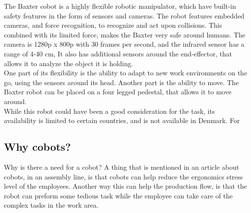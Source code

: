 The Baxter cobot is a highly flexible robotic manipulator, which have built-in safety features in the form of sensors and cameras. The robot features embedded cameras, and force recognition, to recognize and act upon collisions. This combined with its limited force, makes the Baxter very safe around humans.
The camera is 1280p x 800p with 30 frames per second, and the infrared sensor has a range of 4-40 cm, 
It also has additional sensors around the end-effector, that allows it to analyze the object it is holding. \\
One part of its flexibility is the ability to adapt to new work environments on the go, using the sensors around its head. Another part is the ability to move. The Baxter robot can be placed on a four legged pedestal, that allows it to move around. \\
While this robot could have been a good consideration for the task, its availability is limited to certain countries, and is not available in Denmark. For
\cite{retinkbaxter}



\subsection{Why cobots?}\label{ch:Whycobot}
Why is there a need for a cobot? A thing that is mentioned in an article about cobots, in an assembly line, is that cobots can help reduce the ergonomics stress level of the employees\cite{Coboau}. Another way this can help the production flow, is that the robot can preform some tedious task while the employee can take care of the complex tasks in the work area.\\






